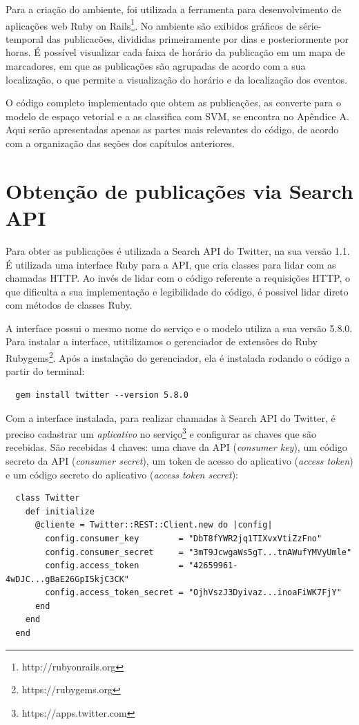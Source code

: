 Para a criação do ambiente, foi utilizada a ferramenta para desenvolvimento de aplicações web Ruby on Rails\footnote{http://rubyonrails.org}. No ambiente são exibidos gráficos de série-temporal das publicacões, divididas primeiramente por dias e posteriormente por horas. É possível visualizar cada faixa de horário da publicação em um mapa de marcadores, em que as publicações são agrupadas de acordo com a sua localização, o que permite a visualização do horário e da localização dos eventos. 

O código completo implementado que obtem as publicações, as converte para o modelo de espaço vetorial e a as classifica com SVM, se encontra no Apêndice A. Aqui serão apresentadas apenas as partes mais relevantes do código, de acordo com a organização das seções dos capítulos anteriores.

\section{Obtenção de publicações via Search API}

Para obter as publicações é utilizada a Search API do Twitter, na sua versão 1.1. É utilizada uma interface Ruby para a API, que cria classes para lidar com as chamadas HTTP. Ao invés de lidar com o código referente a requisições HTTP, o que dificulta a sua implementação e legibilidade do código, é possivel lidar direto com métodos de classes Ruby. 

A interface possui o mesmo nome do serviço e o modelo utiliza a sua versão 5.8.0. Para instalar a interface, utitilizamos o gerenciador de extensões do Ruby Rubygems\footnote{https://rubygems.org}. Após a instalação do gerenciador, ela é instalada rodando o código a partir do terminal:

\begin{lstlisting}
  gem install twitter --version 5.8.0
\end{lstlisting}

Com a interface instalada, para realizar chamadas à Search API do Twitter, é preciso cadastrar um \textit{aplicativo} no serviço\footnote{https://apps.twitter.com} e configurar as chaves que são recebidas. São recebidas 4 chaves: uma chave da API (\textit{consumer key}), um código secreto da API (\textit{consumer secret}), um token de acesso do aplicativo (\textit{access token}) e um código secreto do aplicativo (\textit{access token secret}):

\begin{lstlisting}
  class Twitter
    def initialize
      @cliente = Twitter::REST::Client.new do |config|
        config.consumer_key        = "DbT8fYWR2jq1TIXvxVtiZzFno"
        config.consumer_secret     = "3mT9JcwgaWs5gT...tnAWufYMVyUmle"
        config.access_token        = "42659961-4wDJC...gBaE26GpI5kjC3CK"
        config.access_token_secret = "OjhVszJ3Dyivaz...inoaFiWK7FjY"
      end
    end
  end
\end{lstlisting}

